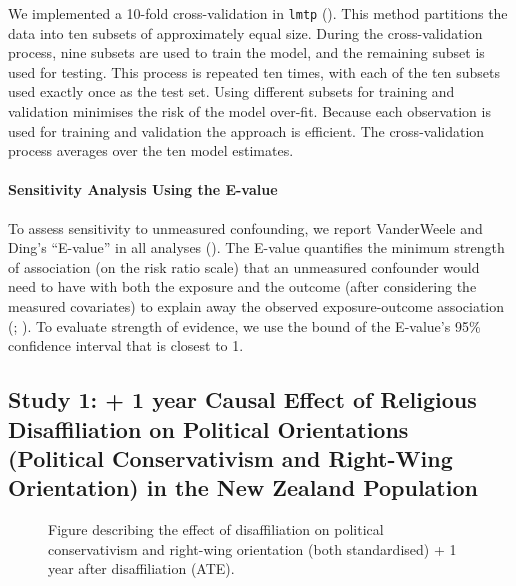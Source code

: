 \documentclass[
  singlecolumn]{article}
\let\oldparagraph\paragraph
\renewcommand{\paragraph}[1]{\oldparagraph{#1}\mbox{}}
\begin{document}
We implemented a 10-fold cross-validation in \texttt{lmtp}
(). This method
partitions the data into ten subsets of approximately equal size. During
the cross-validation process, nine subsets are used to train the model,
and the remaining subset is used for testing. This process is repeated
ten times, with each of the ten subsets used exactly once as the test
set. Using different subsets for training and validation minimises the
risk of the model over-fit. Because each observation is used for
training and validation the approach is efficient. The cross-validation
process averages over the ten model estimates.

\paragraph{Sensitivity Analysis Using the
E-value}\label{sensitivity-analysis-using-the-e-value}

To assess sensitivity to unmeasured confounding, we report VanderWeele
and Ding's ``E-value'' in all analyses
(). The E-value
quantifies the minimum strength of association (on the risk ratio scale)
that an unmeasured confounder would need to have with both the exposure
and the outcome (after considering the measured covariates) to explain
away the observed exposure-outcome association
(;
). To
evaluate strength of evidence, we use the bound of the E-value's 95\%
confidence interval that is closest to 1.

\newpage{}

\subsection{Study 1: + 1 year Causal Effect of Religious Disaffiliation
on Political Orientations (Political Conservativism and Right-Wing
Orientation) in the New Zealand
Population}\label{study-1-1-year-causal-effect-of-religious-disaffiliation-on-political-orientations-political-conservativism-and-right-wing-orientation-in-the-new-zealand-population}

\begin{figure}


\caption{\label{fig-ate}Figure describing the effect of disaffiliation
on political conservativism and right-wing orientation (both
standardised) + 1 year after disaffiliation (ATE).}

\end{figure}%
\end{document}
